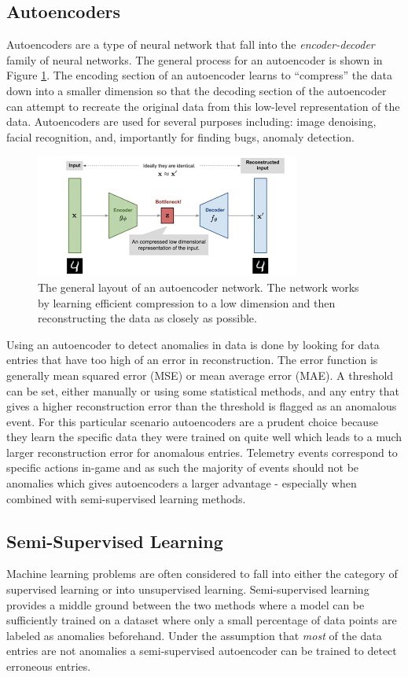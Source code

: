 \documentclass[a4paper,11pt]{article}
\begin{document}
\subsection{Autoencoders}
Autoencoders are a type of neural network that fall into the \textit{encoder-decoder} family of neural networks. The general process for an autoencoder is shown in Figure \ref{autoencoder_general}. The encoding section of an autoencoder learns to ``compress'' the data down into a smaller dimension so that the decoding section of the autoencoder can attempt to recreate the original data from this low-level representation of the data. Autoencoders are used for several purposes including: image denoising, facial recognition, and, importantly for finding bugs, anomaly detection.
\begin{figure}[H]
\centering
\includegraphics[width=.8\textwidth]{autoencoder_general.png}
\caption{The general layout of an autoencoder network. The network works by learning efficient compression to a low dimension and then reconstructing the data as closely as possible.}
\label{autoencoder_general}
\end{figure}
Using an autoencoder to detect anomalies in data is done by looking for data entries that have too high of an error in reconstruction. The error function is generally mean squared error (MSE) or mean average error (MAE). A threshold can be set, either manually or using some statistical methods, and any entry that gives a higher reconstruction error than the threshold is flagged as an anomalous event. For this particular scenario autoencoders are a prudent choice because they learn the specific data they were trained on quite well which leads to a much larger reconstruction error for anomalous entries. Telemetry events correspond to specific actions in-game and as such the majority of events should not be anomalies which gives autoencoders a larger advantage - especially when combined with semi-supervised learning methods.
\subsection{Semi-Supervised Learning}
Machine learning problems are often considered to fall into either the category of supervised learning or into unsupervised learning. Semi-supervised learning provides a middle ground between the two methods where a model can be sufficiently trained on a dataset where only a small percentage of data points are labeled as anomalies beforehand. Under the assumption that \textit{most} of the data entries are not anomalies a semi-supervised autoencoder can be trained to detect erroneous entries.
\end{document}
